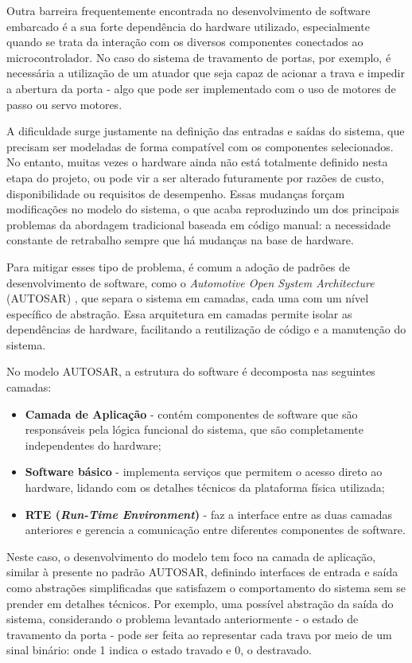 Outra barreira frequentemente  encontrada no desenvolvimento de software embarcado é a sua forte dependência do hardware utilizado, especialmente quando se trata 
da interação com os diversos componentes conectados ao microcontrolador. No caso do sistema de travamento de portas, por exemplo, é necessária a utilização de um 
atuador que seja capaz de acionar a trava e impedir a abertura da porta - algo que pode ser implementado com o uso de motores de passo ou servo motores.

A dificuldade surge justamente na definição das entradas e saídas do sistema, que precisam ser modeladas de forma compatível com os componentes selecionados. No 
entanto, muitas vezes o hardware ainda não está totalmente definido nesta etapa do projeto, ou pode vir a ser alterado futuramente por razões de custo, 
disponibilidade ou requisitos de desempenho. Essas mudanças forçam modificações no modelo do sistema, o que acaba reproduzindo um dos principais problemas da 
abordagem tradicional baseada em código manual: a necessidade constante de retrabalho sempre que há mudanças na base de hardware.

Para mitigar esses tipo de problema, é comum a adoção de padrões de desenvolvimento de software, como o \textit{Automotive Open System Architecture} (AUTOSAR) 
\cite{autosarClassic}, que separa o sistema em camadas, cada uma com um nível específico de abstração. Essa arquitetura em camadas permite isolar as dependências 
de hardware, facilitando a reutilização de código e a manutenção do sistema. 

No modelo AUTOSAR, a estrutura do software é decomposta nas seguintes camadas:

\begin{itemize}
	\item \textbf{Camada de Aplicação} - contém componentes de software que são responsáveis pela lógica funcional do sistema, que são completamente independentes do hardware;
	\item \textbf{Software básico} - implementa serviços que permitem o acesso direto ao hardware, lidando com os detalhes técnicos da plataforma física utilizada;
	\item \textbf{RTE (\textit{Run-Time Environment})} - faz a interface entre as duas camadas anteriores e gerencia a comunicação entre diferentes componentes de software.
\end{itemize}

Neste caso, o desenvolvimento do modelo tem foco na camada de aplicação, similar à presente no padrão AUTOSAR, definindo interfaces de entrada e saída como 
abstrações simplificadas que satisfazem o comportamento do sistema sem se prender em detalhes técnicos. Por exemplo, uma possível abstração da saída do sistema, 
considerando o problema levantado anteriormente - o estado de travamento da porta - pode ser feita ao representar cada trava por meio de um sinal binário: onde 
1 indica o estado travado e 0, o destravado. 

